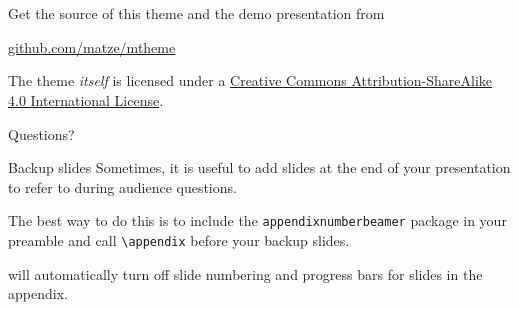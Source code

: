 \documentclass[10pt,aspectratio=169,english]{beamer}
\begin{document}
\section{}

\begin{frame}{}

  Get the source of this theme and the demo presentation from

  \begin{center}\url{github.com/matze/mtheme}\end{center}

  The theme \emph{itself} is licensed under a
  \href{http://creativecommons.org/licenses/by-sa/4.0/}{Creative Commons
  Attribution-ShareAlike 4.0 International License}.

  \begin{center}\ccbysa\end{center}

\end{frame}

\begin{frame}[standout]
  Questions?
\end{frame}

\appendix

\begin{frame}[fragile]{Backup slides}
  Sometimes, it is useful to add slides at the end of your presentation to
  refer to during audience questions.

  The best way to do this is to include the \verb|appendixnumberbeamer|
  package in your preamble and call \verb|\appendix| before your backup slides.

  \themename will automatically turn off slide numbering and progress bars for
  slides in the appendix.
\end{frame}

\begin{frame}[allowframebreaks]{}

  
  

\end{frame}
\end{document}

